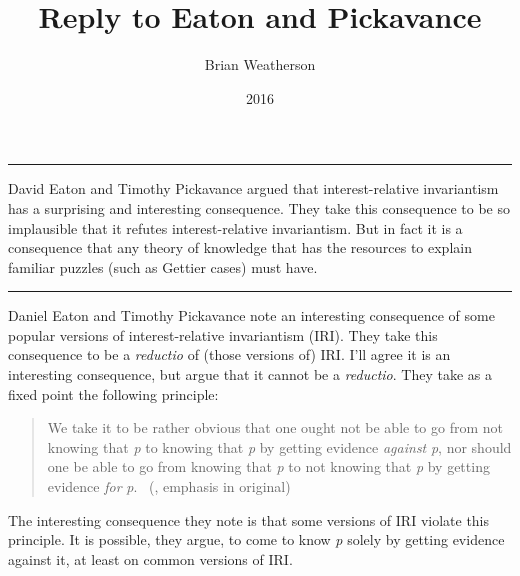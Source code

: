 \documentclass[
  10pt,
  letterpaper,
  DIV=11,
  numbers=noendperiod,
  twoside]{scrartcl}
\title{Reply to Eaton and Pickavance}
\author{Brian Weatherson}
\date{2016}
\renewenvironment{abstract}
 {\vspace{-1.25cm}
 \quotation\small\noindent\rule{\linewidth}{.5pt}\par\smallskip
 \noindent }
 {\par\noindent\rule{\linewidth}{.5pt}\endquotation}
\begin{document}
\maketitle
\begin{abstract}
David Eaton and Timothy Pickavance argued that interest-relative
invariantism has a surprising and interesting consequence. They take
this consequence to be so implausible that it refutes interest-relative
invariantism. But in fact it is a consequence that any theory of
knowledge that has the resources to explain familiar puzzles (such as
Gettier cases) must have.
\end{abstract}

Daniel Eaton and Timothy Pickavance note an interesting consequence of
some popular versions of interest-relative invariantism (IRI). They take
this consequence to be a \emph{reductio} of (those versions of) IRI.
I'll agree it is an interesting consequence, but argue that it cannot be
a \emph{reductio}. They take as a fixed point the following principle:

\begin{quote}
We take it to be rather obvious that one ought not be able to go from
not knowing that \emph{p} to knowing that \emph{p} by getting evidence
\emph{against} \emph{p}, nor should one be able to go from knowing that
\emph{p} to not knowing that \emph{p} by getting evidence \emph{for}
\emph{p}. ~(, emphasis in original)
\end{quote}

The interesting consequence they note is that some versions of IRI
violate this principle. It is possible, they argue, to come to know
\emph{p} solely by getting evidence against it, at least on common
versions of IRI.
\end{document}
